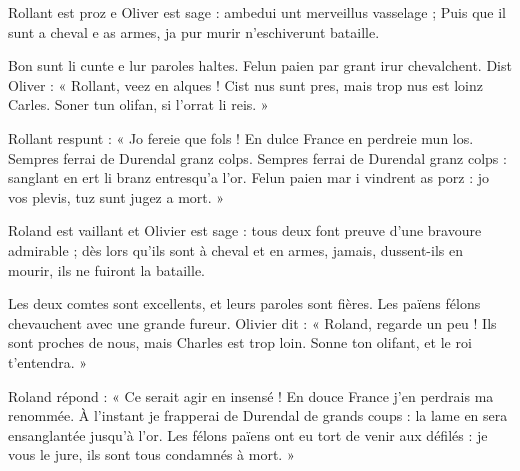 \documentclass[12pt]{article}
\begin{document}
\begin{pairs}



\begin{Leftside}
	\beginnumbering

	 \pstart	 

Rollant est proz e Oliver est sage : 
ambedui unt merveillus vasselage ; Puis que il sunt a cheval e as armes, ja pur murir n'eschiverunt bataille.

\pend
\pstart
Bon sunt li cunte e lur paroles haltes. Felun paien par grant irur chevalchent.
Dist Oliver : « Rollant, veez en alques ! Cist nus sunt pres, mais trop nus est loinz Carles. Soner tun olifan, si l'orrat li reis. »
\pend
\pstart

Rollant respunt : « Jo fereie que fols ! En dulce France en perdreie mun los. Sempres ferrai de Durendal granz colps.
Sempres ferrai de Durendal granz colps : sanglant en ert li branz entresqu'a l'or. Felun paien mar i vindrent as porz : jo vos plevis, tuz sunt jugez a mort. »
\pend
\endnumbering
\end{Leftside}


\begin{Rightside}
\beginnumbering

\pstart


Roland est vaillant et Olivier est sage : tous deux font preuve d'une bravoure admirable ; dès lors qu'ils sont à cheval et en armes, jamais, dussent-ils en mourir, ils ne fuiront la bataille.

\pend

\pstart
Les deux comtes sont excellents, et leurs paroles sont fières. Les païens félons chevauchent avec une grande fureur. Olivier dit : « Roland, regarde un peu ! Ils sont proches de nous, mais Charles est trop loin. Sonne ton olifant, et le roi t'entendra. »
\pend

\pstart
Roland répond : « Ce serait agir en insensé ! En douce France j'en perdrais ma renommée. À l'instant je frapperai de Durendal de grands coups : la lame en sera ensanglantée jusqu'à l'or. Les félons païens ont eu tort de venir aux défilés : je vous le jure, ils sont tous condamnés à mort. »
\pend

\endnumbering

\end{Rightside}

\end{pairs}

    \Columns
\end{document}
